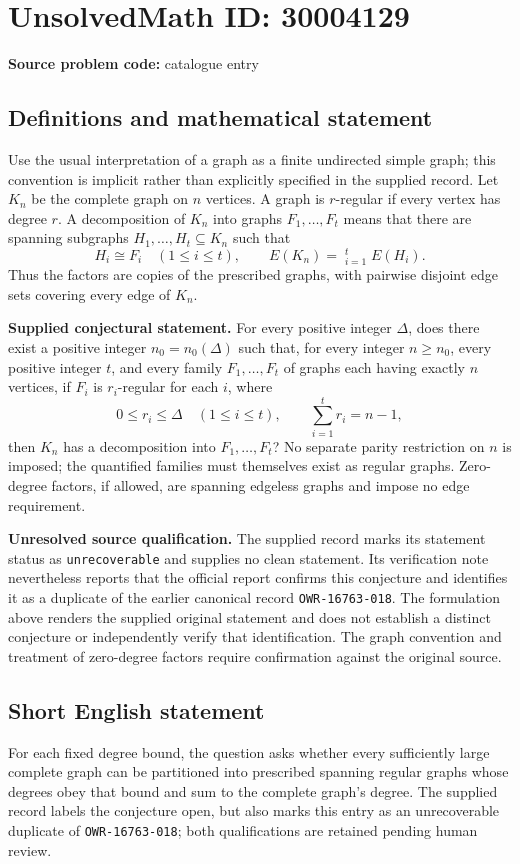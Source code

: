 \documentclass[11pt]{article}
\begin{document}
\section*{UnsolvedMath ID: 30004129}
\textbf{Source problem code:} catalogue entry
\subsection{Definitions and mathematical statement}
Use the usual interpretation of a graph as a finite undirected simple graph; this convention is implicit rather than explicitly specified in the supplied record. Let \(K_n\) be the complete graph on \(n\) vertices. A graph is \(r\)-regular if every vertex has degree \(r\). A decomposition of \(K_n\) into graphs \(F_1,\ldots,F_t\) means that there are spanning subgraphs \(H_1,\ldots,H_t\subseteq K_n\) such that
\[
H_i\cong F_i\quad(1\le i\le t),\qquad
E(K_n)=\mathop{\dot\bigcup}_{i=1}^{t}E(H_i).
\]
Thus the factors are copies of the prescribed graphs, with pairwise disjoint edge sets covering every edge of \(K_n\).

\textbf{Supplied conjectural statement.} For every positive integer \(\Delta\), does there exist a positive integer \(n_0=n_0(\Delta)\) such that, for every integer \(n\ge n_0\), every positive integer \(t\), and every family \(F_1,\ldots,F_t\) of graphs each having exactly \(n\) vertices, if \(F_i\) is \(r_i\)-regular for each \(i\), where
\[
0\le r_i\le\Delta\quad(1\le i\le t),\qquad
\sum_{i=1}^{t}r_i=n-1,
\]
then \(K_n\) has a decomposition into \(F_1,\ldots,F_t\)? No separate parity restriction on \(n\) is imposed; the quantified families must themselves exist as regular graphs. Zero-degree factors, if allowed, are spanning edgeless graphs and impose no edge requirement.

\textbf{Unresolved source qualification.} The supplied record marks its statement status as \texttt{unrecoverable} and supplies no clean statement. Its verification note nevertheless reports that the official report confirms this conjecture and identifies it as a duplicate of the earlier canonical record \texttt{OWR-16763-018}. The formulation above renders the supplied original statement and does not establish a distinct conjecture or independently verify that identification. The graph convention and treatment of zero-degree factors require confirmation against the original source.
\subsection{Short English statement}
For each fixed degree bound, the question asks whether every sufficiently large complete graph can be partitioned into prescribed spanning regular graphs whose degrees obey that bound and sum to the complete graph's degree. The supplied record labels the conjecture open, but also marks this entry as an unrecoverable duplicate of \texttt{OWR-16763-018}; both qualifications are retained pending human review.
\end{document}
